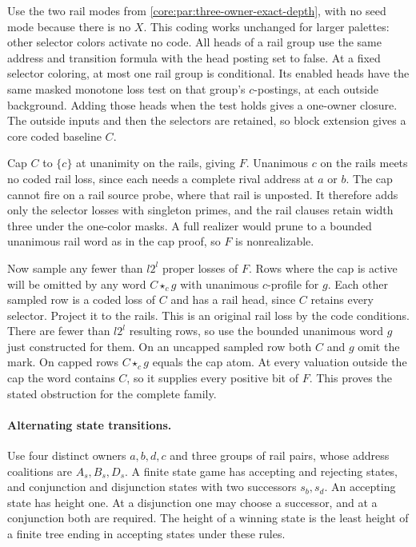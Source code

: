 Use the two rail modes from
\cref{core:par:three-owner-exact-depth}, with
no seed mode because there is no $X$. This
coding works unchanged for larger palettes:
other selector colors activate no code.
All heads of a rail group use the same address
and transition formula with the head posting
set to false. At a fixed selector coloring,
at most one rail group is conditional. Its
enabled heads have the same masked monotone
loss test on that group's $c$-postings, at
each outside background. Adding those heads
when the test holds gives a one-owner closure.
The outside inputs and then the selectors
are retained, so block extension gives a
core coded baseline $C$.

Cap $C$ to $\{c\}$ at unanimity on the rails,
giving $F$. Unanimous $c$ on the rails meets
no coded rail loss, since each needs a complete
rival address at $a$ or $b$. The cap cannot
fire on a rail source probe, where that rail
is unposted. It therefore adds only the
selector losses with singleton primes, and
the rail clauses retain width three under the
one-color masks. A full realizer would prune
to a bounded unanimous rail word as in the
cap proof, so $F$ is nonrealizable.

Now sample any fewer than $l2^l$ proper losses
of $F$. Rows where the cap is active will be
omitted by any word $C\star_c g$ with unanimous
$c$-profile for $g$. Each other sampled row
is a coded loss of $C$ and has a rail head,
since $C$ retains every selector. Project it
to the rails. This is an original rail loss
by the code conditions. There are fewer than
$l2^l$ resulting rows, so use the bounded
unanimous word $g$ just constructed for them.
On an uncapped sampled row both $C$ and $g$
omit the mark. On capped rows $C\star_c g$
equals the cap atom. At every valuation
outside the cap the word contains $C$, so
it supplies every positive bit of $F$.
This proves the stated obstruction for
the complete family.

\paragraph{Alternating state transitions.}
Use four distinct owners $a,b,d,c$ and three groups of rail pairs,
whose address coalitions are $A_s,B_s,D_s$. A finite state game has
accepting and rejecting states, and conjunction and disjunction states
with two successors $s_b,s_d$. An accepting state has height one.
At a disjunction one may choose a successor, and at a conjunction
both are required. The height of a winning state is the least height
of a finite tree ending in accepting states under these rules.

